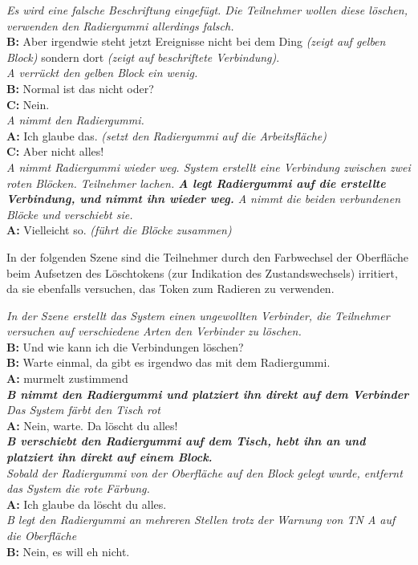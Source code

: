 \begin{transkript}
	\emph{Es wird eine falsche Beschriftung eingefügt. Die Teilnehmer wollen diese löschen, verwenden den Radiergummi allerdings falsch.}\\
	\textbf{B:} Aber irgendwie steht jetzt Ereignisse nicht bei dem Ding \emph{(zeigt auf gelben Block)} sondern dort \emph{(zeigt auf beschriftete Verbindung)}.\\
	\emph{A verrückt den gelben Block ein wenig.}\\
	\textbf{B:} Normal ist das nicht oder?\\
	\textbf{C:} Nein.\\
	\emph{A nimmt den Radiergummi.}\\
	\textbf{A:} Ich glaube das. \emph{(setzt den Radiergummi auf die Arbeitsfläche)}\\
	\textbf{C:} Aber nicht alles!\\
	\emph{A nimmt Radiergummi wieder weg. System erstellt eine Verbindung zwischen zwei roten Blöcken. Teilnehmer lachen. \textbf{A legt Radiergummi auf die erstellte Verbindung, und nimmt ihn wieder weg.} A nimmt die beiden verbundenen Blöcke und verschiebt sie.}\\
	\textbf{A:} Vielleicht so. \emph{(führt die Blöcke zusammen)}
\end{transkript}

In der folgenden Szene sind die Teilnehmer durch den Farbwechsel der Oberfläche beim Aufsetzen des Löschtokens (zur Indikation des Zustandswechsels) irritiert, da sie ebenfalls versuchen, das Token zum Radieren zu verwenden.

\begin{transkript}
	\emph{In der Szene erstellt das System einen ungewollten Verbinder, die Teilnehmer versuchen auf verschiedene Arten den Verbinder zu löschen.}\\
	\textbf{B:} Und wie kann ich die Verbindungen löschen?\\
	\textbf{B:} Warte einmal, da gibt es irgendwo das mit dem Radiergummi.\\
	\textbf{A:} murmelt zustimmend \\
	\emph{\textbf{B nimmt den Radiergummi und platziert ihn direkt auf dem Verbinder}}\\
	\emph{Das System färbt den Tisch rot}\\
	\textbf{A:} Nein, warte. Da löscht du alles!\\
	\emph{\textbf{B verschiebt den Radiergummi auf dem Tisch, hebt ihn an und platziert ihn direkt auf einem Block.}}\\
	\emph{Sobald der Radiergummi von der Oberfläche auf den Block gelegt wurde, entfernt das System die rote Färbung.}\\
	\textbf{A:} Ich glaube da löscht du alles.\\
	\emph{B legt den Radiergummi an mehreren Stellen trotz der Warnung von TN A auf die Oberfläche}\\
	\textbf{B:} Nein, es will eh nicht.\\
\end{transkript}


